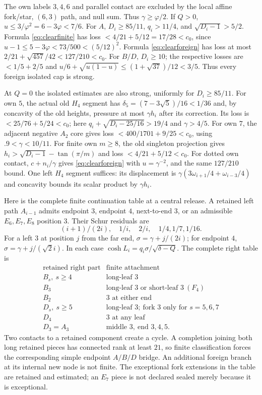 \documentclass[11pt]{article}
\theoremstyle{remark}
\newcommand{\ph}{\varphi}
\begin{document}
The own labels $3,4,6$ and parallel contact are excluded by the
local affine fork/star, $(6,3)$ path, and null sum. Thus
$\gamma\ge\ph/2$. If $Q>0$, $u\le3/\ph^2=6-3\ph<7/6$.
For $A$, $D_i\ge85/11$, $q_i>11/4$, and
$\sqrt{D_i-1}>5/2$. Formula \eqref{eq:clearfinite} has loss
$<4/21+5/12=17/28<c_0$, since
$u-1\le5-3\ph<73/500<(5/12)^2$.
Formula \eqref{eq:clearforeign} has loss at most
$2/21+\sqrt{457}/42<127/210<c_0$.
For $B/D$, $D_i\ge10$; the respective losses are
$<1/5+2/5$ and
$u/6+\sqrt{u(1-u)}\le(1+\sqrt{37})/12<3/5$.
Thus every foreign isolated cap is strong.

At $Q=0$ the isolated estimates are also strong, uniformly for
$D_i\ge85/11$. For own $5$, the actual old $H_4$ segment has
$\delta_5=(7-3\sqrt5)/16<1/36$ and, by concavity of the old
heights, pressure at most $\gamma h_i$ after its correction.
Its loss is $<25/76+5/24<c_0$; here
$q_i+\sqrt{D_i-25/16}>19/4$ and $\gamma>4/5$.
For own $7$, the adjacent negative $A_2$ core gives loss
$<400/1701+9/25<c_0$, using $.9<\gamma<10/11$.
For finite own $m\ge8$, the old singleton projection gives
$h_i>\sqrt{D_i-1}-\tan(\pi/m)$ and loss
$<4/21+5/12<c_0$.
For dotted own contact, $c+n_i/\gamma$ gives
\eqref{eq:clearforeign} with $u=\gamma^{-2}$, and the same
$127/210$ bound. One left $H_4$ segment suffices: its displacement
is $\gamma(3\omega_{i+1}/4+\omega_{i-3}/4)$ and concavity
bounds its scalar product by $\gamma h_i$.

Here is the complete finite continuation table at a central release.
A retained left path $A_{i-1}$ admits endpoint $3$, endpoint $4$,
next-to-end $3$, or an admissible $E_6,E_7,E_8$ position $3$.
Their Schur residuals are
\begin{equation}\label{eq:leftresiduals}
 (i+1)/(2i),\quad1/i,\quad2/i,\quad1/4,1/7,1/16.
\end{equation}
For a left $3$ at position $j$ from the far end,
$\sigma=\gamma+j/(2i)$; for endpoint $4$,
$\sigma=\gamma+j/(\sqrt2 i)$. In each case
$\cosh L_i=q_i\sigma/\sqrt{\delta-Q}$.
The complete right table is
\[
\begin{array}{c|l}
\text{retained right part}&\text{finite attachment}\\ \hline
B_s,\ s\ge4&\text{long-leaf }3\\
B_3&\text{long-leaf }3\text{ or short-leaf }3\ (F_4)\\
B_2&3\text{ at either end}\\
D_s,\ s\ge5&\text{long-leaf }3;\ \text{fork }3\text{ only for }s=5,6,7\\
D_4&3\text{ at any leaf}\\
D_3=A_3&\text{middle }3,\ \text{end }3,4,5 .
\end{array}
\]
Two contacts to a retained component create a cycle. A completion
joining both long retained pieces has connected rank at least $21$,
so finite classification forces the corresponding simple endpoint
$A/B/D$ bridge. An additional foreign branch at its internal new
node is not finite. The exceptional fork extensions in the table
are retained and estimated; an $E_7$ piece is not declared sealed
merely because it is exceptional.
\end{document}
